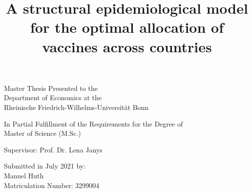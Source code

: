 
\title{A structural epidemiological model for the optimal allocation of vaccines across countries}
\date{}

\maketitle








\begin{center}
\normalsize Master Thesis Presented to the \\
\vspace{0.3cm}
Department of Economics at the\\
\vspace{0.3cm}
Rheinische Friedrich-Wilhelms-Universit{\"a}t Bonn\\
\end{center}
\vspace{0.6cm}
\begin{center}
In Partial Fulfillment of the Requirements for the Degree of \\
Master of Science (M.Sc.)
\end{center}
\vspace{3.5cm}
\begin{center}
Supervisor: Prof. Dr. Lena Janys
\end{center}
\vspace{0.6cm}
\begin{center}
Submitted in July 2021 by: \\
Manuel Huth \\
Matriculation Number: 3299004
\end{center}



\thispagestyle{empty}

\clearpage
